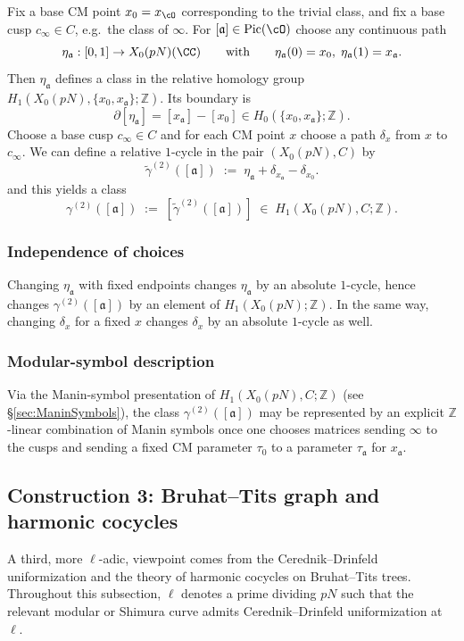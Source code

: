 \documentclass[10pt]{amsart}
\theoremstyle{theostyle}
\newcommand{\ZZ}{\mathbb{Z}}
\renewcommand{\fa}{\mathfrak{a}} \newcommand{\fb}{\mathfrak{b}} \newcommand{\fc}{\mathfrak{c}}
\newcommand{\Pic}{\mathrm{Pic}}
\begin{document}
Fix a base CM point $x_0=x_{\cO}$ corresponding to the trivial class, and
fix a base cusp $c_\infty\in C$, e.g.\ the class of $\infty$.
For $[\fa]\in\Pic(\cO)$ choose any continuous path
\[
\eta_\fa:[0,1]\to X_0(pN)(\CC)
\qquad\text{with}\qquad
\eta_\fa(0)=x_0,\;\eta_\fa(1)=x_\fa.
\]
Then $\eta_\fa$ defines a class in the relative homology group
$H_1(X_0(pN),\{x_0,x_\fa\};\ZZ)$.
Its boundary is
\[
\partial[\eta_\fa]=[x_\fa]-[x_0]\in H_0(\{x_0,x_\fa\};\ZZ).
\]
Choose a base cusp $c_\infty\in C$ and for each CM point $x$ choose a path $\delta_x$ from $x$ to $c_\infty$.  We can define a relative
$1$-cycle in the pair $(X_0(pN),C)$ by
\[
\widetilde\gamma^{(2)}([\fa])
\;:=\;
\eta_\fa + \delta_{x_\fa}-\delta_{x_0}.
\]
and this yields a class
\[
\gamma^{(2)}([\fa]) \;:=\;
[\widetilde\gamma^{(2)}([\fa])]
\;\in\;
H_1(X_0(pN),C;\ZZ).
\]

\subsubsection*{Independence of choices}
Changing $\eta_\fa$ with fixed endpoints changes $\eta_\fa$ by an absolute
	$1$-cycle, hence changes $\gamma^{(2)}([\fa])$ by an element of
	$H_1(X_0(pN);\ZZ)$. In the same way, changing $\delta_x$ for a fixed $x$ changes $\delta_x$ by an absolute
	$1$-cycle as well.

\subsubsection*{Modular-symbol description}
Via the Manin-symbol presentation of $H_1(X_0(pN),C;\ZZ)$ (see \S \ref{sec:ManinSymbols}), the class $\gamma^{(2)}([\fa])$ may be
represented by an explicit $\ZZ$-linear combination of Manin symbols once one
chooses matrices sending $\infty$ to the cusps and sending a fixed CM
parameter $\tau_0$ to a parameter $\tau_\fa$ for $x_\fa$.

\subsection{Construction 3: Bruhat--Tits graph and harmonic cocycles}
\label{subsec:constr3}

A third, more $\ell$-adic, viewpoint comes from the Cerednik--Drinfeld uniformization \cite{Cerednik:Uniformization,Drinfeld:padic} and the theory
of harmonic cocycles on Bruhat--Tits trees.  Throughout this subsection,
$\ell$ denotes a prime dividing $pN$ such that the relevant modular or Shimura curve admits
Cerednik--Drinfeld uniformization at $\ell$.
\end{document}
